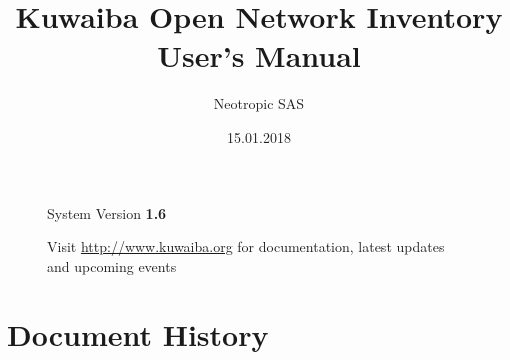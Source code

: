 \documentclass[a4paper]{article}
\title{Kuwaiba Open Network Inventory User's Manual}
\author{Neotropic SAS}
\date{15.01.2018}
\begin{document}
	\maketitle
	
	
	
	\begin{figure}[b]
		\centering System Version \textbf{1.6}
			
		Visit \url{http://www.kuwaiba.org} for documentation, latest updates and upcoming events
	\end{figure}
	
	
	\newpage
	
	\tableofcontents
	
	\clearpage
	\section{Document History}
\end{document}
